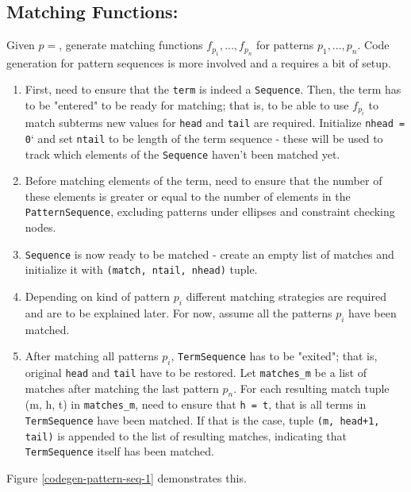 \subsection{Matching Functions: \PatternSequenceNoArg}
Given $p = $\PatternSequence, generate matching functions $f_{p_1}, ..., f_{p_n}$ for patterns $p_1, ..., p_n$. Code generation for pattern sequences is more involved and a requires a bit of setup.

\begin{enumerate}
\item
First, need to ensure that the \texttt{term} is indeed a \texttt{Sequence}.  Then, the term has to be "entered" to be ready for matching; that is, to be able to use $f_{p_i}$ to match subterms new values for \texttt{head} and \texttt{tail} are required. Initialize \texttt{nhead = 0}` and set \texttt{ntail} to be length of the term sequence - these will be used to track which elements of the \texttt{Sequence} haven't been matched yet. 
\item Before matching elements of the term, need to ensure that the number of these elements is greater or equal to the number of elements in the \texttt{PatternSequence}, excluding patterns under ellipses and constraint checking nodes. 
\item \texttt{Sequence} is now ready to be matched - create an empty list of matches  and initialize it with \texttt{(match, ntail, nhead)} tuple. 
\item 
Depending on kind of pattern $p_i$ different matching strategies are required and are to be explained later. For now, assume all the patterns $p_i$ have been matched.
\item
After matching all patterns $p_i$, \texttt{TermSequence} has to be "exited"; that is, original \texttt{head} and \texttt{tail} have to be restored. Let \texttt{matches\_m} be a list of matches after matching the last pattern $p_n$. For each resulting match tuple (m, h, t) in \texttt{matches\_m}, need to ensure that \texttt{h = t}, that is all terms in \texttt{TermSequence} have been matched. If that is the case, tuple \texttt{(m, head+1, tail)} is appended to the list of resulting matches, indicating that \texttt{TermSequence} itself has been matched.
\end{enumerate}
Figure \ref{codegen-pattern-seq-1} demonstrates this.

